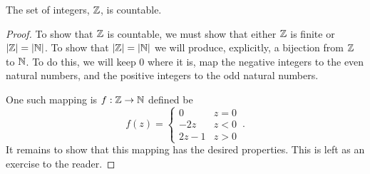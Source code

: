 \guard




\begin{prop}
\label{prop:integersAreCountable}
  The set of integers, $\mathbb{Z}$, is countable.
\end{prop}
\begin{proof}
  To show that $\mathbb{Z}$ is countable, we must show that either $\mathbb{Z}$ is finite or $\vert \mathbb{Z}\vert=\vert \mathbb{N}\vert$.
  To show that $\vert\mathbb{Z}\vert=\vert\mathbb{N}\vert$ we will produce, explicitly, a bijection from $\mathbb{Z}$ to $\mathbb{N}$.
  To do this, we will keep $0$ where it is, map the negative integers to the even natural numbers, and the positive integers to the odd natural numbers.

  One such mapping is $f:\mathbb{Z}\to\mathbb{N}$ defined be \[ f(z) = \begin{cases}
      0 & z= 0 \\
      -2z & z<0 \\
      2z-1 & z>0
   \end{cases}\,. \]
   It remains to show that this mapping has the desired properties.
   This is left as an exercise to the reader.
\end{proof}
